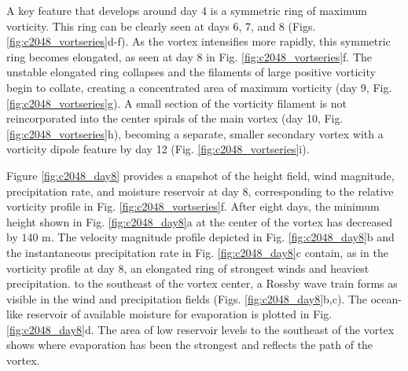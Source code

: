 \documentclass{ametsoc}
\begin{document}
   A key feature that 
   develops around day 4 is a symmetric ring of maximum vorticity. This ring can be clearly 
   seen at days 6, 7, and 8 (Figs. \ref{fig:c2048_vortseries}d-f). As the vortex intensifies more rapidly, this symmetric ring becomes elongated, as
   seen at day 8 in Fig. \ref{fig:c2048_vortseries}f. The unstable elongated ring 
   collapses and the filaments of large positive vorticity begin to collate,
   creating a concentrated area of maximum vorticity (day 9, Fig. \ref{fig:c2048_vortseries}g). 
   A small section of the vorticity filament is not reincorporated into the center spirals
   of the main vortex (day 10, Fig. \ref{fig:c2048_vortseries}h), becoming a separate,
   smaller secondary vortex with a vorticity dipole feature by 
   day 12 (Fig. \ref{fig:c2048_vortseries}i).

   Figure \ref{fig:c2048_day8} provides a snapshot of the height field, wind magnitude, precipitation rate, and moisture reservoir at day 8, 
   corresponding to the relative vorticity profile in Fig. \ref{fig:c2048_vortseries}f.
   After eight days, the minimum height shown in Fig. \ref{fig:c2048_day8}a
   at the center of the vortex has decreased by $140$ m. The velocity magnitude
   profile depicted in Fig. \ref{fig:c2048_day8}b and the instantaneous precipitation rate 
   in Fig. \ref{fig:c2048_day8}c contain, as in the vorticity profile at day 8, an
   elongated ring of strongest winds and heaviest precipitation. to the southeast of the
   vortex center, a Rossby wave train forms as visible in the wind and precipitation
   fields (Figs. \ref{fig:c2048_day8}b,c). The ocean-like reservoir of available moisture 
   for evaporation is plotted in Fig. \ref{fig:c2048_day8}d. The area of low reservoir levels
   to the southeast of the vortex shows where evaporation has been the strongest and
   reflects the path of the vortex.
   
\end{document}
